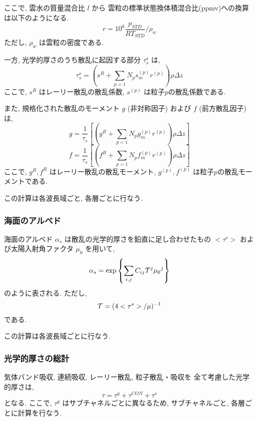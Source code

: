 ここで, 雲水の質量混合比 $l$ から
雲粒の標準状態換体積混合比(ppmv)への換算は以下のようになる.
\begin{equation}
  r = 10^6 \frac{p_{STD}}{R T_{STD}}/\rho_w
\end{equation}
ただし, $\rho_w$ は雲粒の密度である.

一方, 光学的厚さのうち散乱に起因する部分 $\tau_s^s$ は,
\begin{equation}
\tau_s^{s} 
 = \left( s^R + \sum_{p=1}{N_p} s^{(p)}_m r^{(p)}\right) \rho \Delta z
\end{equation}
ここで, $s^R$ はレーリー散乱の散乱係数,
$s^{(p)}$ は粒子$p$の散乱係数である.

また, 規格化された散乱のモーメント 
$g$ (非対称因子) および $f$ (前方散乱因子)は,
\begin{equation}
g = \frac{1}{\tau_s} \left[
    \left( g^R + \sum_{p=1}{N_p} g^{(p)}_m r^{(p)}\right) \rho \Delta z
    \right]
\end{equation}
\begin{equation}
f = \frac{1}{\tau_s} \left[ 
    \left( f^R + \sum_{p=1}{N_p} f^{(p)}_m r^{(p)}\right) \rho \Delta z
    \right]
\end{equation}
ここで, $g^R, f^R$ はレーリー散乱の散乱モーメント,
$g^{(p)}, f^{(p)}$ は粒子$p$の散乱モーメントである.

この計算は各波長域ごと, 各層ごとに行なう.

\subsubsection{海面のアルベド }

海面のアルベド $\alpha_s$ は散乱の光学的厚さを鉛直に足し合わせたもの
$<\tau^{s}>$ および太陽入射角ファクタ $\mu_0$ を用いて,
\begin{equation}
  \alpha_s = \exp\left\{ \sum_{i,j} C_{ij} {\cal T}^j {\mu_0}^j \right\}
\end{equation}
のように表される.
ただし,
\begin{equation}
 {\cal T} = ( 4 <\tau^{s}>/\mu )^{-1}
\end{equation}
である.

この計算は各波長域ごとに行なう.

\subsubsection{光学的厚さの総計}

気体バンド吸収, 連続吸収, レーリー散乱, 粒子散乱・吸収を
全て考慮した光学的厚さは, 
%
\begin{equation}
  \tau = \tau^g + \tau^{CON} + \tau^{s}
\end{equation}
%
となる. ここで, $\tau^g$ はサブチャネルごとに異なるため,
サブチャネルごと, 各層ごとに計算を行なう.

